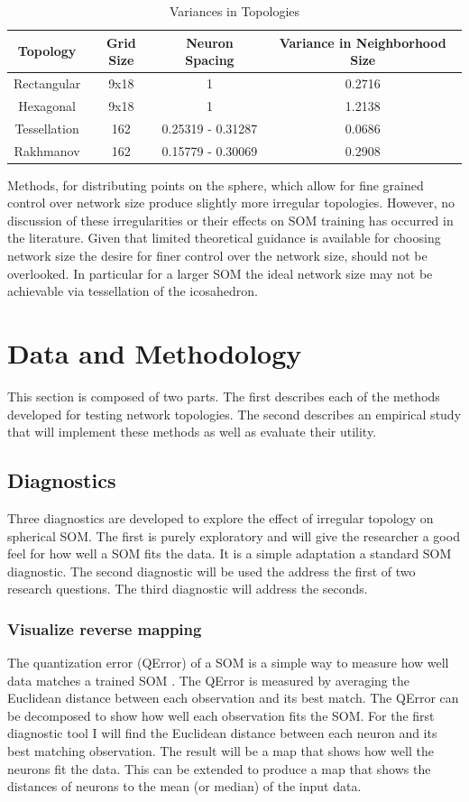 \documentclass[10pt,titlepage]{article}
\begin{document}
\begin{table}[htbp]
\caption{Variances in Topologies}
\begin{center}
\begin{tabular}{|c|c|c|c|}
\hline
Topology&Grid Size&Neuron Spacing&Variance in Neighborhood Size\\
\hline
Rectangular&9x18&1&0.2716\\
Hexagonal&9x18&1&1.2138\\
Tessellation&162&0.25319 - 0.31287& 0.0686\\
Rakhmanov&162&0.15779 - 0.30069& 0.2908\\
\hline
\end{tabular}
\end{center}
\label{table1}
\end{table}

Methods, for distributing points on the sphere, which allow for fine grained
control over network size produce slightly more irregular topologies.  However,
no discussion of these irregularities or their effects on SOM training has
occurred in the literature. Given that limited theoretical guidance is available
for choosing network size the desire for finer control over the network size,
should not be overlooked. In particular for a larger SOM the ideal network size
may not be achievable via tessellation of the icosahedron.

\section{Data and Methodology}
This section is composed of two parts.  The first describes each of
the methods developed for testing network topologies.  The second describes an
empirical study that will implement these methods as well as evaluate their
utility. 

\subsection{Diagnostics}
Three diagnostics are developed to explore the effect of irregular topology on
spherical SOM.  The first is purely exploratory and will give the researcher a
good feel for how well a SOM fits the data.  It is a simple adaptation a
standard SOM diagnostic.  The second diagnostic will be used the address the
first of two research questions. The third diagnostic will address the seconds.

\subsubsection{Visualize reverse mapping}
The quantization error (QError) of a SOM is a simple way to measure how well 
data matches a trained SOM \citep{Kohonen2000}. The QError is measured by averaging
the Euclidean distance between each observation and its best match.  The QError can
be decomposed to show how well each observation fits the SOM.  For the first
diagnostic tool I will find the Euclidean distance between each neuron and its
best matching observation.  The result will be a map that shows how well the
neurons fit the data. This can be extended to produce a map that shows the
distances of neurons to the mean (or median) of the input data.
\end{document}
